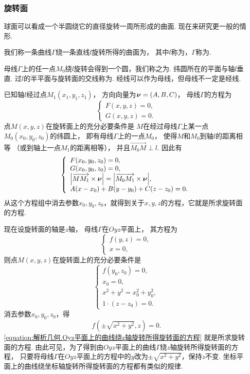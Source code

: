 \subsubsection{旋转面}
球面可以看成一个半圆绕它的直径旋转一周所形成的曲面.
现在来研究更一般的情形.

我们称一条曲线\(\Gamma\)绕一条直线\(l\)旋转所得的曲面为，
其中\(l\)称为，\(\Gamma\)称为.

母线\(\Gamma\)上的任一点\(M_0\)绕\(l\)旋转会得到一个圆，我们称之为.
纬圆所在的平面与轴\(l\)垂直.
过\(l\)的半平面与旋转面的交线称为.
经线可以作为母线，但母线不一定是经线.

已知轴\(l\)经过点\(M_1(x_1,y_1,z_1)\)，
方向向量为\(\boldsymbol{\nu}=(A,B,C)\)，
母线\(\Gamma\)的方程为\[
	\left\{ \begin{array}{l}
		F(x,y,z) = 0, \\
		G(x,y,z) = 0.
	\end{array} \right.
\]
点\(M(x,y,z)\)在旋转面上的充分必要条件是
\(M\)在经过母线\(\Gamma\)上某一点\(M_0(x_0,y_0,z_0)\)的纬圆上，
即有母线\(\Gamma\)上的一点\(M_0\)，
使得\(M\)和\(M_0\)到轴\(l\)的距离相等
（或到轴上一点\(M_1\)的距离相等），
并且\(\vec{M_0 M} \perp l\).
因此有\[
	\left\{ \begin{array}{l}
		F(x_0,y_0,z_0) = 0, \\
		G(x_0,y_0,z_0) = 0, \\
		\abs{\overrightarrow{M M_1} \times \boldsymbol{\nu}} = \abs{\overrightarrow{M_0 M_1} \times \boldsymbol{\nu}}, \\
		A(x-x_0) + B(y-y_0) + C(z-z_0) = 0.
	\end{array} \right.
\]
从这个方程组中消去参数\(x_0,y_0,z_0\)，就得到关于\(x,y,z\)的方程，它就是所求旋转面的方程.

现在设旋转面的轴是\(z\)轴，
母线\(\Gamma\)在\(Oyz\)平面上，
其方程为\[
	\left\{ \begin{array}{l}
		f(y,z) = 0, \\
		x = 0,
	\end{array} \right.
\]
则点\(M(x,y,z)\)在旋转面上的充分必要条件是\[
	\left\{ \begin{array}{l}
		f(y_0,z_0) = 0, \\
		x_0 = 0, \\
		x^2+y^2=x_0^2+y_0^2, \\
		1\cdot(z-z_0) = 0.
	\end{array} \right.
\]
消去参数\(x_0,y_0,z_0\)，得
\begin{equation}\label{equation:解析几何.Oyz平面上的曲线绕z轴旋转所得旋转面的方程}
	f(\pm\sqrt{x^2+y^2},z) = 0.
\end{equation}
\cref{equation:解析几何.Oyz平面上的曲线绕z轴旋转所得旋转面的方程} 就是所求旋转面的方程.
由此可见，为了得到由\(Oyz\)平面上的曲线\(\Gamma\)绕\(z\)轴旋转所得旋转面的方程，
只要将母线\(\Gamma\)在\(Oyz\)平面上的方程中的\(y\)改为\(\pm\sqrt{x^2+y^2}\)，保持\(z\)不变.
坐标平面上的曲线绕坐标轴旋转所得旋转面的方程都有类似的规律.

